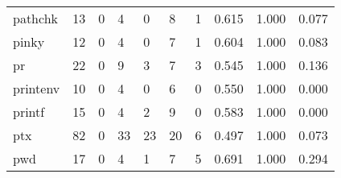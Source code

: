 \begin{longtable}{lp{1.3cm}p{1.3cm}p{1.3cm}p{1.3cm}p{1.3cm}p{1.3cm}p{1.3cm}p{1.3cm}p{1.3cm}}
pathchk   &                     13 &                                             0 &                                            4 &                                           0 &                                            8 &                                          1 &                                0.615 &                                  1.000 &                                0.077 \\
pinky     &                     12 &                                             0 &                                            4 &                                           0 &                                            7 &                                          1 &                                0.604 &                                  1.000 &                                0.083 \\
pr        &                     22 &                                             0 &                                            9 &                                           3 &                                            7 &                                          3 &                                0.545 &                                  1.000 &                                0.136 \\
printenv  &                     10 &                                             0 &                                            4 &                                           0 &                                            6 &                                          0 &                                0.550 &                                  1.000 &                                0.000 \\
printf    &                     15 &                                             0 &                                            4 &                                           2 &                                            9 &                                          0 &                                0.583 &                                  1.000 &                                0.000 \\
ptx       &                     82 &                                             0 &                                           33 &                                          23 &                                           20 &                                          6 &                                0.497 &                                  1.000 &                                0.073 \\
pwd       &                     17 &                                             0 &                                            4 &                                           1 &                                            7 &                                          5 &                                0.691 &                                  1.000 &                                0.294 \\

\end{longtable}
